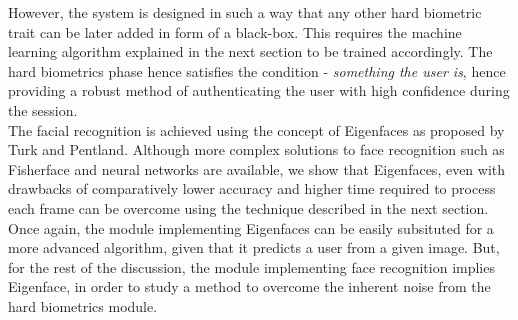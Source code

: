\documentclass[%
        submission,
        notitlepage,
        narroweqnarray,
        inline,
        ]{ieee}
\begin{document}
However, the system is designed in such a way that any other hard biometric trait can be later added in form of a black-box. This requires the machine learning algorithm explained in the next section to be trained accordingly.
The hard biometrics phase hence satisfies the condition - \emph{something the user is}, hence providing a robust method of authenticating the user with high confidence during the session.\\
The facial recognition is achieved using the concept of Eigenfaces\cite{Turk91} as proposed by Turk and Pentland.
Although more complex solutions to face recognition such as Fisherface and neural networks are available, we show that Eigenfaces, even with drawbacks of comparatively lower accuracy and higher time required to process each frame can be overcome using the technique described in the next section.
Once again, the module implementing Eigenfaces can be easily subsituted for a more advanced algorithm, given that it predicts a user from a given image.
But, for the rest of the discussion, the module implementing face recognition implies Eigenface, in order to study a method to overcome the inherent noise from the hard biometrics module.
\end{document}
